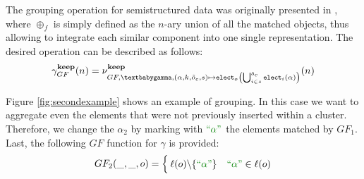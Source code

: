 The grouping operation for semistructured data  was originally presented in \cite{Magnani06}, where  $\oplus_f$ is simply defined as the $n$-ary union of all the matched objects, thus allowing to integrate each similar component into one single representation. The desired operation can be described as follows: 
\begin{equation}\label{eq:grouping}
\gamma_{GF}^{\textbf{keep}}(n)=\nu^{\textbf{keep}}_{GF,\genp,(\alpha,k,\tilde{o}_{c},s)\mapsto \texttt{elect}_{o}\left(\bigcup^{\tilde{o}_c}_{i\in s}\texttt{elect}_i(\alpha)\right)}(n)
\end{equation}
\begin{example}[continues=ex:aggregations,label=ex:aggregations2]
Figure \ref{fig:secondexample} shows an example of grouping. In this case we want to aggregate even the elements that were not previously inserted within a cluster. Therefore, we change the $\alpha_2$ by marking with $\hstr{\alpha}$ the elements matched by $GF_1$.
Last, the following $GF$ function for $\gamma$ is provided:
\[GF_2(\_,\_,o)=\begin{cases}
\ell(o)\backslash\{\hstr{\alpha}\} & \hstr{\alpha}\in\ell(o)\\

\end{cases}\]
\end{example}
